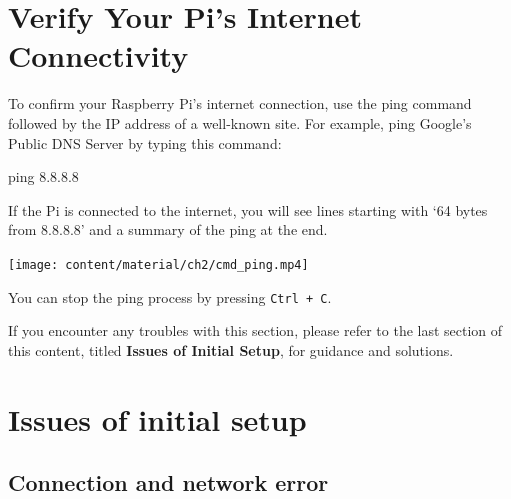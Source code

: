 \documentclass[
  letterpaper,
]{scrbook}
\newenvironment{Shaded}{\begin{snugshade}}{\end{snugshade}}
\newcommand{\FunctionTok}[1]{\textcolor[rgb]{0.28,0.35,0.67}{#1}}
\newcommand{\NormalTok}[1]{\textcolor[rgb]{0.00,0.23,0.31}{#1}}
\begin{document}
\hypertarget{verify-your-pis-internet-connectivity}{%
\section{Verify Your Pi's Internet
Connectivity}\label{verify-your-pis-internet-connectivity}}

To confirm your Raspberry Pi's internet connection, use the ping command
followed by the IP address of a well-known site. For example, ping
Google's Public DNS Server by typing this command:

\begin{Shaded}
\begin{Highlighting}[]
\FunctionTok{ping}\NormalTok{ 8.8.8.8}
\end{Highlighting}
\end{Shaded}

If the Pi is connected to the internet, you will see lines starting with
`64 bytes from 8.8.8.8' and a summary of the ping at the end.

\texttt{[image: content/material/ch2/cmd\_ping.mp4]}

You can stop the ping process by pressing \texttt{Ctrl\ +\ C}.

\begin{tcolorbox}[enhanced jigsaw, bottomrule=.15mm, opacitybacktitle=0.6, toprule=.15mm, colback=white, colbacktitle=quarto-callout-note-color!10!white, left=2mm, colframe=quarto-callout-note-color-frame, coltitle=black, title=\textcolor{quarto-callout-note-color}{\faInfo}\hspace{0.5em}{Note}, opacityback=0, breakable, bottomtitle=1mm, toptitle=1mm, titlerule=0mm, arc=.35mm, leftrule=.75mm, rightrule=.15mm]

If you encounter any troubles with this section, please refer to the
last section of this content, titled \textbf{Issues of Initial Setup},
for guidance and solutions.

\end{tcolorbox}

\hypertarget{issues-of-initial-setup}{%
\section{Issues of initial setup}\label{issues-of-initial-setup}}

\hypertarget{connection-and-network-error}{%
\subsection{Connection and network
error}\label{connection-and-network-error}}
\end{document}

